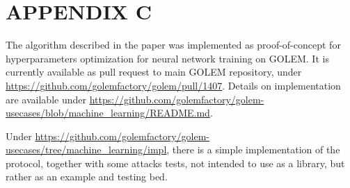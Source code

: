 \documentclass{winnower}
\begin{document}
\newpage
\section*{APPENDIX C}

The algorithm described in the paper was implemented as proof-of-concept for hyperparameters optimization for neural network training on GOLEM. It is currently available as pull request to main GOLEM repository, under \url{https://github.com/golemfactory/golem/pull/1407}. Details on implementation are available under \url{https://github.com/golemfactory/golem-usecases/blob/machine_learning/README.md}.

Under \url{https://github.com/golemfactory/golem-usecases/tree/machine_learning/impl}, there is a simple implementation of the protocol, together with some attacks tests, not intended to use as a library, but rather as an example and testing bed.

\newpage
\end{document}
